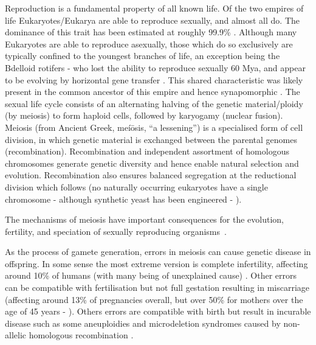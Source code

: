 Reproduction is a fundamental property of all known life. Of the two empires of life Eukaryotes/Eukarya are able to reproduce sexually, and almost all do. The dominance of this trait has been estimated at roughly 99.9\% \parencite{White1978Modes}. Although many Eukaryotes are able to reproduce asexually, those which do so exclusively are typically confined to the youngest branches of life, an exception being the Bdelloid rotifers - who lost the ability to reproduce sexually 60 Mya, and appear to be evolving by horizontal gene transfer \parencite{Debortoli2016Genetic}. This shared characteristic was likely present in the common ancestor of this empire and hence synapomorphic \parencite{Bernstein2013Evolutionary}. The sexual life cycle consists of an alternating halving of the genetic material/ploidy (by meiosis) to form haploid cells, followed by karyogamy (nuclear fusion). Meiosis (from Ancient Greek, meíōsis, “a lessening”) is a specialised form of cell division, in which genetic material is exchanged between the parental genomes (recombination). Recombination and independent assortment of homologous chromosomes generate genetic diversity and hence enable natural selection and evolution. Recombination also ensures balanced segregation at the reductional division which follows (no naturally occurring eukaryotes have a single chromosome - although synthetic yeast has been engineered - \cite{Shao2018Creating}).

The mechanisms of meiosis have important consequences for the evolution, fertility, and speciation of sexually reproducing organisms~\parencite{Davies2016Reengineering,Hassold2007Origin}. 


As the process of gamete generation, errors in meiosis can cause genetic disease in offspring. In some sense the most extreme version is complete infertility, affecting around 10\% of humans (with many being of unexplained cause) \parencite{Datta2016Prevalence, Hamada2011Unexplained}. Other errors can be compatible with fertilisation but not full gestation resulting in miscarriage (affecting around 13\% of pregnancies overall, but over 50\% for mothers over the age of 45 years - \cite{Magnus2019Role}). Others errors are compatible with birth but result in incurable disease such as some aneuploidies \parencite{Hassold2007Origin} and microdeletion syndromes caused by non-allelic homologous recombination \parencite{Myers2008common}.


